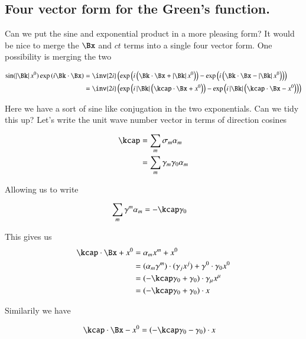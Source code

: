 \documentclass{article}
\begin{document}
\subsection{ Four vector form for the Green's function. }

Can we put the sine and exponential product in a more pleasing form?  It would be nice to merge the $\Bx$ and $ct$ terms into a 
single four vector form.  One possibility is merging the two

\begin{align*}
\sin( \Abs{\Bk} x^0 ) \exp\left( i \Bk \cdot \Bx \right)
&=
\inv{2i} \left(
\exp\left( i \left( \Bk \cdot \Bx +\Abs{\Bk} x^0 \right) \right)
-\exp\left( i \left( \Bk \cdot \Bx -\Abs{\Bk} x^0 \right) \right)
\right) \\
&=
\inv{2i} \left(
\exp\left( i \Abs{\Bk} \left( \kcap \cdot \Bx + x^0 \right) \right)
-\exp\left( i \Abs{\Bk} \left( \kcap \cdot \Bx - x^0 \right) \right)
\right)
\end{align*}

Here we have a sort of sine like conjugation in the two exponentials.  Can we tidy this up?  Let's write the unit wave number
vector in terms of direction cosines

\begin{align*}
\kcap 
&= \sum_m \sigma_m \alpha_m \\
&= \sum_m \gamma_m \gamma_0 \alpha_m \\
\end{align*}

Allowing us to write

\begin{align*}
\sum_m \gamma^m \alpha_m &= -\kcap \gamma_0
\end{align*}

This gives us
\begin{align*}
\kcap \cdot \Bx + x^0 
&= \alpha_m x^m + x^0 \\
&= (\alpha_m \gamma^m) \cdot (\gamma_j x^j) + \gamma^0 \cdot \gamma_0 x^0 \\
&= (-\kcap \gamma_0 + \gamma_0) \cdot \gamma_\mu x^\mu \\
&= (-\kcap \gamma_0 + \gamma_0) \cdot x
\end{align*}

Similarily we have

\begin{align*}
\kcap \cdot \Bx - x^0  &= (-\kcap \gamma_0 - \gamma_0) \cdot x
\end{align*}
\end{document}
